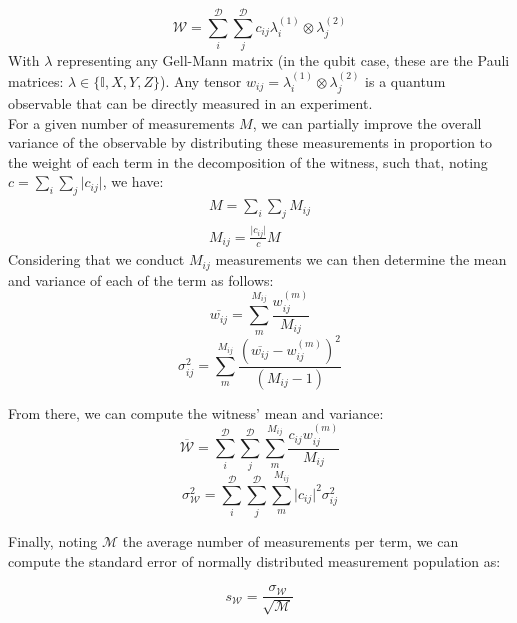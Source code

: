 \documentclass[%
 reprint,
 superscriptaddress,
 amsmath,
 amssymb,
 aps,
 longbibliography
]{revtex4-2}
\begin{document}
\begin{appendices}
\begin{equation}
    \mathcal{W} = \sum_i^\mathcal{D}\sum_j^\mathcal{D} c_{ij} \lambda_i^{(1)} \otimes \lambda_j^{(2)}
\end{equation}
\indent With $\lambda$ representing any Gell-Mann matrix (in the qubit case, these are the Pauli matrices: $\lambda \in \{\mathbb{I}, X, Y, Z \}$). Any tensor $w_{ij} = \lambda_i^{(1)} \otimes \lambda_j^{(2)}$ is a quantum observable that can be directly measured in an experiment. \\
\indent For a given number of measurements $M$, we can partially improve the overall variance of the observable by distributing these measurements in proportion to the weight of each term in the decomposition of the witness, such that, noting $c = \sum_i \sum_j \lvert c_{ij} \rvert$, we have: 
 \begin{align}
    M = \sum_i \sum_j M_{ij} \\
    M_{ij} =  \frac{\lvert c_{ij} \rvert}{c} M
\end{align}
\indent Considering that we conduct $M_{ij}$ measurements we can then determine the mean and variance of each of the term as follows: 
 \begin{equation}
    \overline{w_{ij}} = \sum_m^{M_{ij}} \frac{w_{ij}^{(m)}}{M_{ij}}
\end{equation}
 \begin{equation}
    \sigma_{ij}^2 = \sum_m^{M_{ij}} \frac{(\overline{w_{ij}} - w_{ij}^{(m)})^2}{(M_{ij} - 1)}
\end{equation}

\indent From there, we can compute the witness' mean and variance:
 \begin{equation}
    \overline{\mathcal{W}} = \sum_i^\mathcal{D} \sum_j^\mathcal{D} \sum_m^{M_{ij}} \frac{c_{ij} w_{ij}^{(m)}}{M_{ij}}
\end{equation}
 \begin{equation}
    \sigma_{\mathcal{W}}^2 = \sum_i^\mathcal{D} \sum_j^\mathcal{D} \sum_m^{M_{ij}} \lvert c_{ij}\rvert^2 \sigma_{ij}^2 
\end{equation}

\indent Finally, noting $\mathcal{M}$ the average number of measurements per term, we can compute the standard error of normally distributed measurement population as:

 \begin{equation}
    s_{\mathcal{W}} = \frac{\sigma_{\mathcal{W}}}{\sqrt{\mathcal{M}}}
\end{equation}


\end{appendices}
\end{document}
